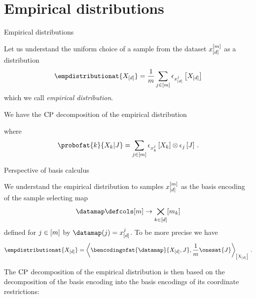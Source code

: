 \documentclass{beamer}
\begin{document}
    \section{Empirical distributions}

    \begin{frame}{Empirical distributions}

        Let us understand the uniform choice of a sample from the dataset $x_{[d]}^{[m]}$ as a distribution
        \begin{align*}
            \empdistributionat{\shortcatvariables}
            = \frac{1}{\datdim} \sum_{\datindexin} \onehotmapofat{\shortcatindices^{\datindex}}{\shortcatvariables}
        \end{align*}
        which we call \emph{empirical distribution}.

        We have the $\mathrm{CP}$ decomposition of the empirical distribution
        
        where
        \begin{align*}
            \probofat{\catenumerator}{\catvariableof{\catenumerator}|\datvariable}
            = \sum_{\datindexin}
            \onehotmapofat{\catindexof{\catenumerator}^{\datindex}}{\catvariableof{\catenumerator}} \otimes
            \onehotmapofat{\datindex}{\datvariable} \, .
        \end{align*}

    \end{frame}

    \begin{frame}{Perspective of basis calculus}

        We understand the empirical distribution to samples $x_{[d]}^{[m]}$ as the basis encoding of the sample selecting map
        \begin{align*}
            \datamap \defcols [\datdim] \rightarrow \bigtimes_{\catenumeratorin} [\catdimof{\catenumerator}]
        \end{align*}
        defined for $j\in[m]$ by $\datamap(\datindex) = \shortcatindices^{\datindex}$.
        To be more precise we have
        \begin{align*}
            \empdistributionat{\shortcatvariables} =
            \contractionof{\bencodingofat{\datamap}{\shortcatvariables,\datvariable},\frac{1}{\datdim}\onesat{\datvariable}}{\shortcatvariables} \, .
        \end{align*}

        The $\mathrm{CP}$ decomposition of the empirical distribution is then based on the decomposition of the basis encoding into the basis encodings of its coordinate restrictions:

        

    \end{frame}
\end{document}

